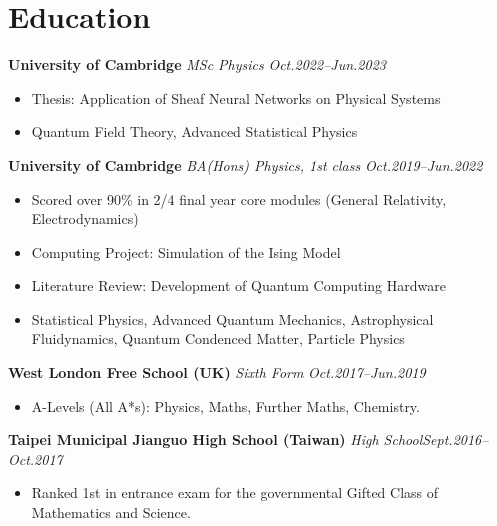 \documentclass[11pt,a4paper,roman]{moderncv}        %
\begin{document}
\makecvtitle

\section{Education}

\textbf{University of Cambridge} \textit{MSc Physics} \hfill \textit{Oct.2022--Jun.2023}
\vspace*{1mm}
\begin{itemize}
    \item Thesis: Application of Sheaf Neural Networks on Physical Systems
    \item Quantum Field Theory, Advanced Statistical Physics
\end{itemize}

\vspace*{3mm}


\textbf{University of Cambridge} \textit{BA(Hons) Physics, 1st class} \hfill \textit{Oct.2019--Jun.2022}
\vspace*{1mm}
\begin{itemize}
    \item Scored over 90\% in 2/4 final year core modules (General Relativity, Electrodynamics)
	\item Computing Project: Simulation of the Ising Model
	\item Literature Review: Development of Quantum Computing Hardware
    \item Statistical Physics, Advanced Quantum Mechanics, Astrophysical Fluidynamics, Quantum Condenced Matter, Particle Physics
	\end{itemize}
\vspace*{3mm}

\textbf{West London Free School (UK)} \textit{Sixth Form} \hfill \textit{Oct.2017--Jun.2019}
\vspace*{1mm}
\begin{itemize}
\item{A-Levels (All A*s): Physics, Maths, Further Maths, Chemistry.}
\end{itemize}
\vspace*{3mm}

\textbf{Taipei Municipal Jianguo High School (Taiwan)} \textit{High School}\hfill \textit{Sept.2016--Oct.2017}
\vspace*{1mm}
\begin{itemize}
\item{Ranked 1st in entrance exam for the governmental Gifted Class of Mathematics and Science.}
\end{itemize}
\end{document}

